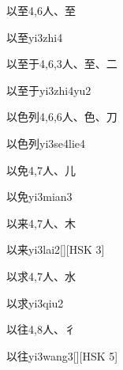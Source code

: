 \begin{Entry}{以至}{4,6}{⼈、⾄}
  \begin{Phonetics}{以至}{yi3zhi4}
  \end{Phonetics}
\end{Entry}

\begin{Entry}{以至于}{4,6,3}{⼈、⾄、⼆}
  \begin{Phonetics}{以至于}{yi3zhi4yu2}
  \end{Phonetics}
\end{Entry}

\begin{Entry}{以色列}{4,6,6}{⼈、⾊、⼑}
  \begin{Phonetics}{以色列}{yi3se4lie4}
  \end{Phonetics}
\end{Entry}

\begin{Entry}{以免}{4,7}{⼈、⼉}
  \begin{Phonetics}{以免}{yi3mian3}
  \end{Phonetics}
\end{Entry}

\begin{Entry}{以来}{4,7}{⼈、⽊}
  \begin{Phonetics}{以来}{yi3lai2}[][HSK 3]
  \end{Phonetics}
\end{Entry}

\begin{Entry}{以求}{4,7}{⼈、⽔}
  \begin{Phonetics}{以求}{yi3qiu2}
  \end{Phonetics}
\end{Entry}

\begin{Entry}{以往}{4,8}{⼈、⼻}
  \begin{Phonetics}{以往}{yi3wang3}[][HSK 5]
  \end{Phonetics}
\end{Entry}

